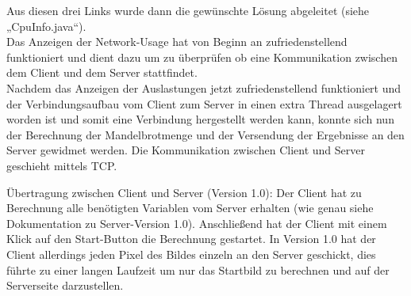 \documentclass[12pt, onecolumn, notitlepage]{scrartcl}
\begin{document}
Aus diesen drei Links wurde dann die gewünschte Lösung abgeleitet (siehe „CpuInfo.java“).\\
Das Anzeigen der Network-Usage hat von Beginn an zufriedenstellend funktioniert und dient dazu um zu überprüfen ob eine Kommunikation zwischen dem Client und dem Server stattfindet.\\
Nachdem das Anzeigen der Auslastungen jetzt zufriedenstellend funktioniert und der Verbindungsaufbau vom Client zum Server in einen extra Thread ausgelagert worden ist und somit eine Verbindung hergestellt werden kann, konnte sich nun der Berechnung der Mandelbrotmenge und der Versendung der Ergebnisse an den Server gewidmet werden. Die Kommunikation zwischen Client und Server geschieht mittels TCP. \par
Übertragung zwischen Client und Server (Version 1.0): 
Der Client hat zu Berechnung alle benötigten Variablen vom Server erhalten (wie genau siehe Dokumentation zu Server-Version 1.0). Anschließend hat der Client mit einem Klick auf den Start-Button die Berechnung gestartet. In Version 1.0 hat der Client allerdings jeden Pixel des Bildes einzeln an den Server geschickt, dies führte zu einer langen Laufzeit um nur das Startbild zu berechnen und auf der Serverseite darzustellen.\par
\end{document}
